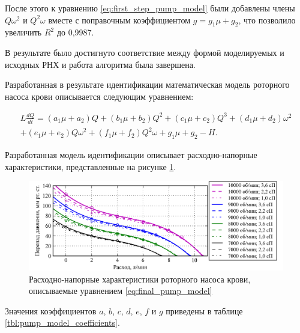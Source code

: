 После этого к уравнению \eqref{eq:first_step_pump_model} были добавлены члены $Q\omega^2$ и $Q^2 \omega$ вместе с поправочным коэффициентом $g = g_1\mu + g_2$, что позволило увеличить $R^2$ до 0,9987.%

В результате было достигнуто соответствие между формой моделируемых и исходных РНХ и работа алгоритма была завершена. 

Разработанная в результате идентификации математическая модель роторного насоса крови описывается следующим уравнением: 

\begin{multline}
 L\frac{dQ}{dt} = (a_1\mu+a_2)Q + (b_1\mu+b_2)Q^2 + (c_1\mu+c_2)Q^3 + (d_1\mu+d_2)\omega^2 \\+ (e_1\mu+e_2)Q\omega^2 + (f_1\mu+f_2)Q^2\omega + g_1\mu+g_2 - H.
\label{eq:final_pump_model}
\end{multline}

Разработанная модель идентификации описывает расходно-напорные характеристики, представленные на рисунке \ref{img:final_pump_model}.

\begin{figure}[ht] 
  \center
  \includegraphics [scale=1.0] {../images/c2_static_model_final_dis}
  \caption{Расходно-напорные характеристики роторного насоса крови, описываемые уравнением \eqref{eq:final_pump_model}} 
  \label{img:final_pump_model}  
\end{figure}

Значения коэффициентов $a$, $b$, $c$, $d$, $e$, $f$ и $g$ приведены в таблице \ref{tbl:pump_model_coefficients}. 

